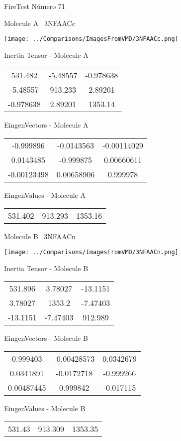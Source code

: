 \vtab[-3cm]
\begin{center}
{\large FireTest \tab Número 71}
\end{center}
\begin{multicols}{2}
\begin{center}

Molecule A \
3NFAACc

\texttt{[image: ../Comparisons/ImagesFromVMD/3NFAACc.png]}

Inertia Tensor - Molecule A \\
\begin{tabular}{|c c c|}
531.482	 & 	-5.48557	 & 	-0.978638	 \\
-5.48557	 & 	913.233	 & 	2.89201	 \\
-0.978638	 & 	2.89201	 & 	1353.14
\end{tabular}

\vtab
 EingenVectors - Molecule A     \\
\begin{tabular}{|c c c|}
-0.999896	 & 	-0.0143563	 & 	-0.00114029	 \\
0.0143485	 & 	-0.999875	 & 	0.00660611	 \\
-0.00123498	 & 	0.00658906	 & 	0.999978
\end{tabular}

\vtab
 EingenValues - Molecule A     \\
\begin{tabular}{|c c c|}
531.402	 & 	913.293	 & 	1353.16	 \\
\end{tabular}
\columnbreak

Molecule B \
3NFAACn

\texttt{[image: ../Comparisons/ImagesFromVMD/3NFAACn.png]}

Inertia Tensor - Molecule B \\
\begin{tabular}{|c c c|}
531.896	 & 	3.78027	 & 	-13.1151	 \\
3.78027	 & 	1353.2	 & 	-7.47403	 \\
-13.1151	 & 	-7.47403	 & 	912.989
\end{tabular}

\vtab
 EingenVectors - Molecule B     \\
\begin{tabular}{|c c c|}
0.999403	 & 	-0.00428573	 & 	0.0342679	 \\
0.0341891	 & 	-0.0172718	 & 	-0.999266	 \\
0.00487445	 & 	0.999842	 & 	-0.017115
\end{tabular}

\vtab
 EingenValues - Molecule B     \\
\begin{tabular}{|c c c|}
531.43	 & 	913.309	 & 	1353.35	 \\
\end{tabular}

\end{center}
\end{multicols}

